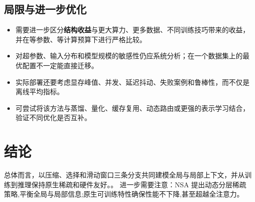 \documentclass[UTF8,11pt,a4paper]{ctexart}
\newcommand{\term}[1]{\textbf{\textcolor{mainblue}{#1}}}
\begin{document}
\subsection{局限与进一步优化}
\begin{itemize}
\item 需要进一步区分\term{结构收益}与更大算力、更多数据、不同训练技巧带来的收益，并在等参数、等计算预算下进行严格比较。
\item 对超参数、输入分布和模型规模的敏感性仍应系统分析；在一个数据集上的最优配置不一定能直接迁移。
\item 实际部署还要考虑显存峰值、并发、延迟抖动、失败案例和鲁棒性，而不仅是离线平均指标。
\item 可尝试将该方法与蒸馏、量化、缓存复用、动态路由或更强的表示学习结合，验证不同优化是否互补。
\end{itemize}

\section{结论}
总体而言，以压缩、选择和滑动窗口三条分支共同建模全局与局部上下文，并从训练到推理保持原生稀疏和硬件友好。。 进一步需要注意：NSA 提出动态分层稀疏策略,平衡全局与局部信息;原生可训练特性确保性能不下降,甚至超越全注意力。
\end{document}
